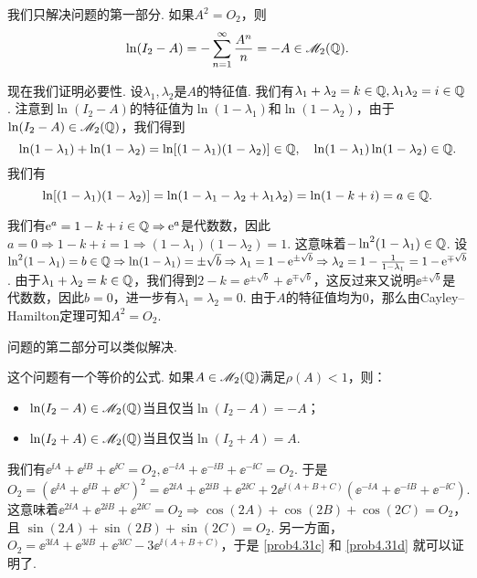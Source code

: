 \begin{solution}
  我们只解决问题的第一部分. 如果$A^2=O_2$，则
  \[
    \ln(I_2 - A) = - \sum_{n=1}^\infty \frac{A^n}n = -A \in\mathscr M_2(\mathbb Q).
  \]

  现在我们证明必要性. 设$\lambda_1,\lambda_2$是$A$的特征值. 我们有$\lambda_1+\lambda_2=k\in\mathbb Q,\lambda_1\lambda_2
  =i\in\mathbb Q $. 注意到$\ln(I_2-A)$的特征值为$\ln(1-\lambda_1)$和$\ln(1-\lambda_2)$，由于$\ln(I_2-A)\in\mathscr M_2(\mathbb Q)$，我们得到
  \[
    \ln(1-\lambda_1) + \ln(1-\lambda_2) = \ln[(1-\lambda_1)(1-\lambda_2)] \in \mathbb Q,\quad
    \ln(1-\lambda_1) \ln(1-\lambda_2) \in \mathbb Q.
  \]
  我们有
  \[
    \ln [(1-\lambda_1)(1-\lambda_2)] = \ln(1-\lambda_1-\lambda_2+\lambda_1\lambda_2) = \ln(1-k+i) = a\in\mathbb Q.
  \]

  我们有$\operatorname{\!\!\;\mathrm e}^a=1-k+i\in\mathbb Q\Rightarrow \operatorname{\!\!\;\mathrm e}^a$是代数数，因此$a=0\Rightarrow1-k+i=1\Rightarrow(1-\lambda_1)(1-\lambda_2)=1$. 这意味着$-\ln^2(1-\lambda_1)\in\mathbb Q$. 设$\ln^2(1-\lambda_1)=b\in\mathbb Q\Rightarrow\ln(1-\lambda_1)
  =\pm\sqrt b\Rightarrow\lambda_1=1-\operatorname{\!\!\;\mathrm e}^{\pm\sqrt b}\Rightarrow\lambda_2=1-\frac1{1-\lambda_1}=1-
  \operatorname{\!\!\;\mathrm e}^{\mp\sqrt b}$. 由于$\lambda_1+\lambda_2=k\in\mathbb Q$，我们得到$2-k=\ee^{\pm\sqrt b}+\ee^{\mp\sqrt b} $，这反过来又说明$\ee^{\pm\sqrt b}$是代数数，因此$b=0$，进一步有$\lambda_1=\lambda_2=0$. 由于$A$的特征值均为0，那么由Cayley--Hamilton定理可知$A^2=O_2$.

  问题的第二部分可以类似解决.
\end{solution}

\begin{remark}
  这个问题有一个等价的公式. 如果$A\in\mathscr M_2(\mathbb Q)$满足$\rho(A)<1$，则：
  \begin{itemize}
    \item $\ln(I_2-A)\in\mathscr M_2(\mathbb Q)$当且仅当$\ln(I_2-A)=-A$；
    \item $\ln(I_2+A)\in\mathscr M_2(\mathbb Q)$当且仅当$\ln(I_2+A)=A$.
  \end{itemize}
\end{remark}

\begin{solution}
  我们有$\ee^{\ii A}+\ee^{\ii B}+\ee^{\ii C}=O_2,\ee^{-\ii A}+\ee^{-\ii B}+\ee^{-\ii C}=O_2$. 于是
  \[
    O_2 = (\ee^{\ii A}+\ee^{\ii B}+\ee^{\ii C})^2 = \ee^{2\ii A} + \ee^{2\ii B} + \ee^{2\ii C} + 2\ee^{\ii(A+B+C)}
    (\ee^{-\ii A}+\ee^{-\ii B}+\ee^{-\ii C}).
  \]
  这意味着$\ee^{2\ii A}+\ee^{2\ii B}+\ee^{2\ii C}=O_2\Rightarrow\cos(2A)+\cos(2B)+\cos(2C)=O_2$，且
  $\sin(2A)+\sin(2B)+\sin(2C)=O_2$. 另一方面，$O_2=\ee^{3\ii A}+\ee^{3\ii B}+\ee^{3\ii C}-3\ee^{\ii(A+B+C)}$，于是 \ref{prob4.31c} 和 \ref{prob4.31d} 就可以证明了.
\end{solution}

